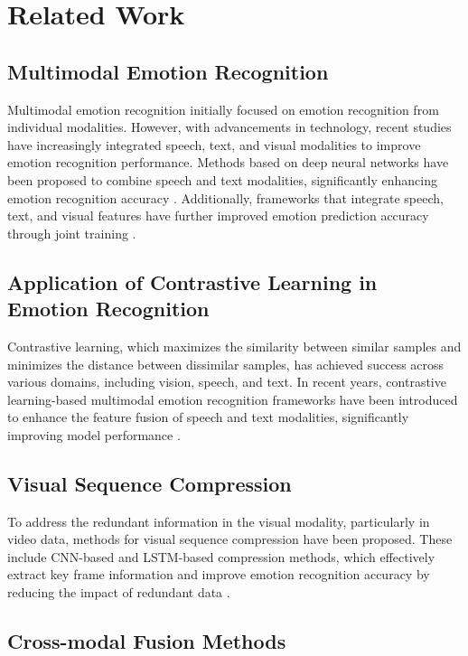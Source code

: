 \section{Related Work}
\subsection{Multimodal Emotion Recognition}

Multimodal emotion recognition initially focused on emotion recognition from individual modalities. However, with advancements in technology, recent studies have increasingly integrated speech, text, and visual modalities to improve emotion recognition performance. Methods based on deep neural networks have been proposed to combine speech and text modalities, significantly enhancing emotion recognition accuracy \citep{abdullah2021multimodal}. Additionally, frameworks that integrate speech, text, and visual features have further improved emotion prediction accuracy through joint training \citep{gupta2024visatronic}.

\subsection{Application of Contrastive Learning in Emotion Recognition}

Contrastive learning, which maximizes the similarity between similar samples and minimizes the distance between dissimilar samples, has achieved success across various domains, including vision, speech, and text. In recent years, contrastive learning-based multimodal emotion recognition frameworks have been introduced to enhance the feature fusion of speech and text modalities, significantly improving model performance \citep{mai2022hybrid}.

\subsection{Visual Sequence Compression}

To address the redundant information in the visual modality, particularly in video data, methods for visual sequence compression have been proposed. These include CNN-based and LSTM-based compression methods, which effectively extract key frame information and improve emotion recognition accuracy by reducing the impact of redundant data \citep{kugate2024efficient,fan2016video}.

\subsection{Cross-modal Fusion Methods}

